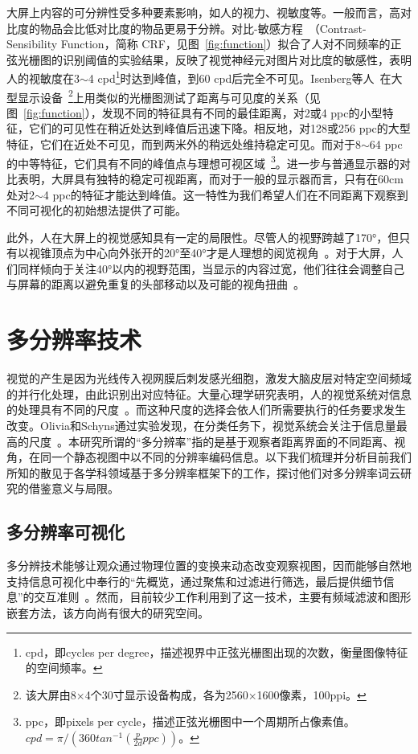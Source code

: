 大屏上内容的可分辨性受多种要素影响，如人的视力、视敏度等。一般而言，高对比度的物品会比低对比度的物品更易于分辨。对比-敏感方程~\supercite{Bull2014}（Contrast-Sensibility Function，简称 CRF，见图~\ref{fig:function}）拟合了人对不同频率的正弦光栅图的识别阈值的实验结果，反映了视觉神经元对图片对比度的敏感性，表明人的视敏度在3$\sim$4  cpd\footnote{cpd，即cycles per degree，描述视界中正弦光栅图出现的次数，衡量图像特征的空间频率。}时达到峰值，到60 cpd后完全不可见。Isenberg等人~\supercite{Isenberg2013}在大型显示设备~\footnote{该大屏由8×4个30寸显示设备构成，各为2560×1600像素，100ppi。}上用类似的光栅图测试了距离与可见度的关系（见图~\ref{fig:function}），发现不同的特征具有不同的最佳距离，对2或4 ppc的小型特征，它们的可见性在稍近处达到峰值后迅速下降。相反地，对128或256 ppc的大型特征，它们在近处不可见，而到两米外的稍远处维持稳定可见。而对于8$\sim$64 ppc的中等特征，它们具有不同的峰值点与理想可视区域~\footnote{ppc，即pixels per cycle，描述正弦光栅图中一个周期所占像素值。$cpd = \pi / (360tan^{-1}(\frac{p}{2d}ppc))$。}。进一步与普通显示器的对比表明，大屏具有独特的稳定可视距离，而对于一般的显示器而言，只有在60cm处对2$\sim$4 ppc的特征才能达到峰值。这一特性为我们希望人们在不同距离下观察到不同可视化的初始想法提供了可能。

此外，人在大屏上的视觉感知具有一定的局限性。尽管人的视野跨越了170°，但只有以视锥顶点为中心向外张开的20°至40°才是人理想的阅览视角~\supercite{Swaminathan1997}。对于大屏，人们同样倾向于关注40°以内的视野范围，当显示的内容过宽，他们往往会调整自己与屏幕的距离以避免重复的头部移动以及可能的视角扭曲~\supercite{Isenberg2012}。


\section{多分辨率技术}
视觉的产生是因为光线传入视网膜后刺发感光细胞，激发大脑皮层对特定空间频域的并行化处理，由此识别出对应特征。大量心理学研究表明，人的视觉系统对信息的处理具有不同的尺度~\supercite{Joubert2007}。而这种尺度的选择会依人们所需要执行的任务要求发生改变。Olivia和Schyns通过实验发现，在分类任务下，视觉系统会关注于信息量最高的尺度~\supercite{Oliva1997}。本研究所谓的“多分辨率”指的是基于观察者距离界面的不同距离、视角，在同一个静态视图中以不同的分辨率编码信息。以下我们梳理并分析目前我们所知的散见于各学科领域基于多分辨率框架下的工作，探讨他们对多分辨率词云研究的借鉴意义与局限。


\subsection{多分辨率可视化}
多分辨技术能够让观众通过物理位置的变换来动态改变观察视图，因而能够自然地支持信息可视化中奉行的``先概览，通过聚焦和过滤进行筛选，最后提供细节信息''的交互准则~\supercite{Shneiderman96}。然而，目前较少工作利用到了这一技术，主要有频域滤波和图形嵌套方法，该方向尚有很大的研究空间。

